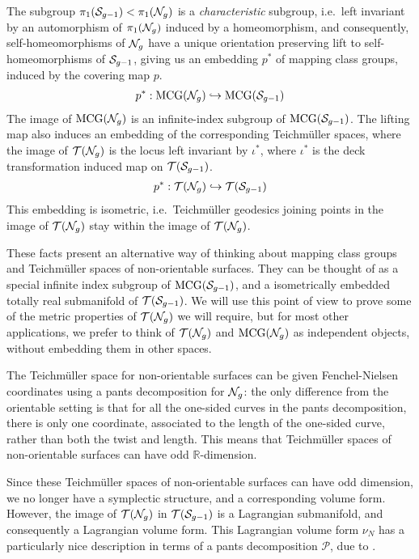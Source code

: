 The subgroup $\pi_1(\mathcal{S}_{g-1}) < \pi_1(\mathcal{N}_g)$ is a \emph{characteristic} subgroup, i.e.\ left invariant by an automorphism of $\pi_{1}(\mathcal{N}_g)$ induced by a homeomorphism, and consequently, self-homeomorphisms of $\mathcal{N}_g$ have a unique orientation preserving lift to self-homeomorphisms of $\mathcal{S}_{g-1}$, giving us an embedding $p^\ast$ of mapping class groups, induced by the covering map $p$.
\begin{align*}
  p^{\ast}: \mathrm{MCG}(\mathcal{N}_g) \hookrightarrow \mathrm{MCG}(\mathcal{S}_{g-1})
\end{align*}
The image of $\mathrm{MCG}(\mathcal{N}_g)$ is an infinite-index subgroup of $\mathrm{MCG}(\mathcal{S}_{g-1})$.
The lifting map also induces an embedding of the corresponding Teichmüller spaces, where the image of $\mathcal{T}(\mathcal{N}_g)$ is the locus left invariant by $\iota^{\ast}$, where $\iota^{\ast}$ is the deck transformation induced map on $\mathcal{T}(\mathcal{S}_{g-1})$.
\begin{align*}
  p^{\ast}: \mathcal{T}(\mathcal{N}_g) \hookrightarrow \mathcal{T}(\mathcal{S}_{g-1})
\end{align*}
This embedding is isometric, i.e.\ Teichmüller geodesics joining points in the image of $\mathcal{T}(\mathcal{N}_g)$ stay within the image of $\mathcal{T}(\mathcal{N}_g)$.

These facts present an alternative way of thinking about mapping class groups and Teichmüller spaces of non-orientable surfaces.
They can be thought of as a special infinite index subgroup of $\mathrm{MCG}(\mathcal{S}_{g-1})$, and a isometrically embedded totally real submanifold of $\mathcal{T}(\mathcal{S}_{g-1})$.
We will use this point of view to prove some of the metric properties of $\mathcal{T}(\mathcal{N}_g)$ we will require, but for most other applications, we prefer to think of $\mathcal{T}(\mathcal{N}_g)$ and $\mathrm{MCG}(\mathcal{N}_g)$ as independent objects, without embedding them in other spaces.

The Teichmüller space for non-orientable surfaces can be given Fenchel-Nielsen coordinates using a pants decomposition for $\mathcal{N}_g$: the only difference from the orientable setting is that for all the one-sided curves in the pants decomposition, there is only one coordinate, associated to the length of the one-sided curve, rather than both the twist and length.
This means that Teichmüller spaces of non-orientable surfaces can have odd $\mathbb{R}$-dimension.

Since these Teichmüller spaces of non-orientable surfaces can have odd dimension, we no longer have a symplectic structure, and a corresponding volume form.
However, the image of $\mathcal{T}(\mathcal{N}_g)$ in $\mathcal{T}(\mathcal{S}_{g-1})$ is a Lagrangian submanifold, and consequently a Lagrangian volume form.
This Lagrangian volume form $\nu_N$ has a particularly nice description in terms of a pants decomposition $\mathcal{P}$, due to \textcite{norbury2008lengths}.

